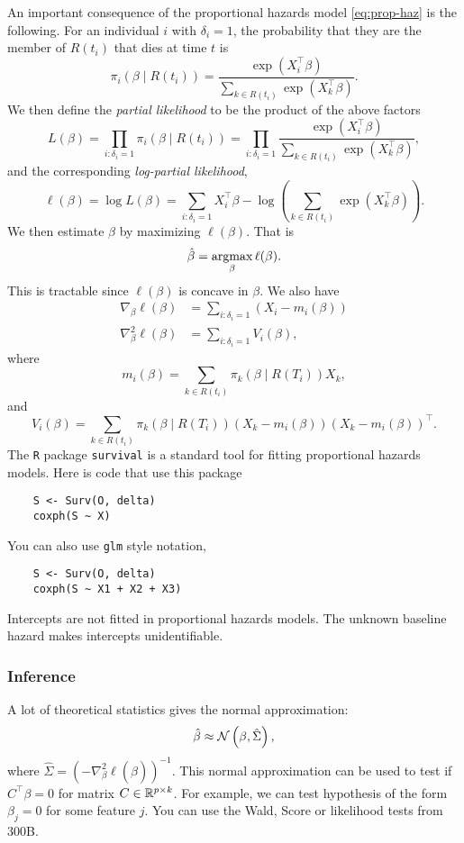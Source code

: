 An important consequence of the proportional hazards model \eqref{eq:prop-haz} is the following. For an individual $i$ with $\delta_i=1$, the probability that they are the member of $R(t_i)$ that dies at time $t$ is 
\[\pi_i(\beta\mid R(t_i)) = \frac{\exp(X_i^\top \beta)}{\sum_{k \in R(t_i)} \exp(X_k^\top \beta)}. \]
We then define the \emph{partial likelihood} to be the product of the above factors 
\[L(\beta) = \prod_{i:\delta_i=1} \pi_i(\beta \mid R(t_i)) = \prod_{i:\delta_i = 1}\frac{\exp(X_i^\top \beta)}{\sum_{k \in R(t_i)} \exp(X_k^\top \beta)}, \]
and the corresponding \emph{log-partial likelihood},
\[\ell(\beta) = \log L(\beta) = \sum_{i:\delta_i = 1} X_i^\top \beta -\log \left(\sum_{k \in R(t_i)} \exp(X_k^\top \beta)\right). \]
We then estimate $\beta$ by maximizing $\ell(\beta)$. That is
\[\hat{\beta} = \operatorname*{argmax}_{\beta} \ell(\beta). \]
This is tractable since $\ell(\beta)$ is concave in $\beta$. We also have
\begin{align*}
    \nabla_\beta \ell(\beta) &=\sum_{i :\delta_i = 1}\left( X_i - m_i(\beta)\right)\\
    \nabla^2_\beta \ell(\beta) &=\sum_{i:\delta_i=1}V_i(\beta),
\end{align*}
where
\[m_i(\beta) = \sum_{k \in R(t_i)}\pi_k(\beta \mid R(T_i))X_k,\]
and
\[ V_i(\beta) = \sum_{k \in R(t_i)}\pi_k(\beta \mid R(T_i))(X_k - m_i(\beta))(X_k - m_i(\beta))^\top.\]
The \verb|R| package \verb|survival| is a standard tool for fitting proportional hazards models. Here is code that use this package
\begin{verbatim}
    S <- Surv(O, delta)
    coxph(S ~ X)
\end{verbatim}
You can also use \verb|glm| style notation,
\begin{verbatim}
    S <- Surv(O, delta)
    coxph(S ~ X1 + X2 + X3)
\end{verbatim}
Intercepts are not fitted in proportional hazards models. The unknown baseline hazard makes intercepts unidentifiable.


\subsubsection*{Inference}
A lot of theoretical statistics gives the normal approximation:
\[\hat{\beta} \approx {\mathcal N}\left(\beta, \hat{\Sigma}\right), \]
where $\hat{\Sigma} = \left(-\nabla^2_\beta \ell(\hat{\beta})\right)^{-1}$. This normal approximation can be used to test if $C^\top\beta = 0$ for matrix $C \in \mathbb{R}^{p \times k}$. For example, we can test hypothesis of the form $\beta_j=0$ for some feature $j$. You can use the Wald, Score or likelihood tests from 300B.

